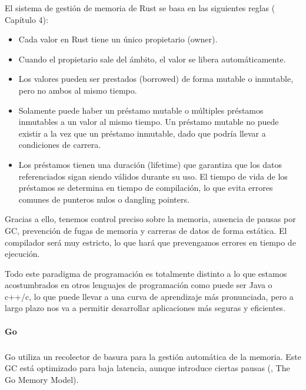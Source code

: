El sistema de gestión de memoria de Rust se basa en las siguientes reglas (\cite{rustbook2024} Capítulo 4):
\begin{itemize}
    \item Cada valor en Rust tiene un único propietario (owner).
    \item Cuando el propietario sale del ámbito, el valor se libera automáticamente.
    \item Los valores pueden ser prestados (borrowed) de forma mutable o inmutable, pero no ambos al mismo tiempo.
    \item Solamente puede haber un préstamo mutable o múltiples préstamos inmutables a un valor al mismo tiempo. Un préstamo mutable no puede existir a la vez que un préstamo inmutable, dado que podría llevar a condiciones de carrera.
    \item Los préstamos tienen una duración (lifetime) que garantiza que los datos referenciados sigan siendo válidos durante su uso. El tiempo de vida de los préstamos se determina en tiempo de compilación, lo que evita errores comunes de punteros nulos o dangling pointers.
\end{itemize}

Gracias a ello, tenemos control preciso sobre la memoria, ausencia de pausas por GC, prevención de fugas de memoria y carreras de datos de forma estática. El compilador será muy estricto, lo que hará que prevengamos errores en tiempo de ejecución.

Todo este paradigma de programación es totalmente distinto a lo que estamos acostumbrados en otros lenguajes de programación como puede ser Java o c++/c, lo que puede llevar a una curva de aprendizaje más pronunciada, pero a largo plazo nos va a permitir desarrollar aplicaciones más seguras y eficientes.

\paragraph{Go}
\subparagraph{}

Go utiliza un recolector de basura para la gestión automática de la memoria. Este GC está optimizado para baja latencia, aunque introduce ciertas pausas (\cite{go-documentation}, The Go Memory Model).

